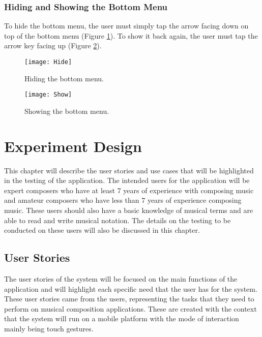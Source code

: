 \subsubsection{Hiding and Showing the Bottom Menu}
To hide the bottom menu, the user must simply tap the arrow facing down on top of the bottom menu (Figure \ref{fig:hide}). To show it back again, the user must tap the arrow key facing up (Figure \ref{fig:show}).

\begin{figure}[H]
	\centering
	\texttt{[image: Hide]}
    \caption{Hiding the bottom menu.}
    \label{fig:hide}
\end{figure}

\begin{figure}[H]
	\centering
	\texttt{[image: Show]}
    \caption{Showing the bottom menu.}
    \label{fig:show}
\end{figure}

\section{Experiment Design}

This chapter will describe the user stories and use cases that will be highlighted in the testing of the application. The intended users for the application will be expert composers who have at least 7 years of experience with composing music and amateur composers who have less than 7 years of experience composing music. These users should also have a basic knowledge of musical terms and are able to read and write musical notation. The details on the testing to be conducted on these users will also be discussed in this chapter.

\subsection{User Stories}
The user stories of the system will be focused on the main functions of the application and will highlight each specific need that the user has for the system. These user stories came from the users, representing the tasks that they need to perform on musical composition applications. These are created with the context that the system will run on a mobile platform with the mode of interaction mainly being touch gestures. 


